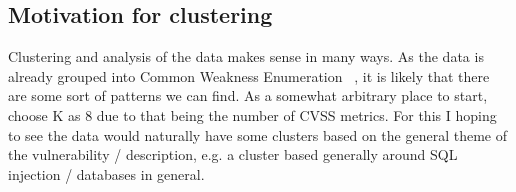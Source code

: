 \documentclass[12pt]{article}
\begin{document}
\begin{table}[H]
	\centering
	\caption{Comparison of the effects of the pre-trained models on the CVSS v3.1 dataset (Part 2).}
	\label{tab:distil_part2}
\end{table}

\subsection{Motivation for clustering}


Clustering and analysis of the data makes sense in many ways. As the data is already grouped into
Common Weakness Enumeration~\cite{CWE} , it is likely that there are some sort of patterns we can
find. As a somewhat arbitrary place to start, choose K as 8 due to that being the number of CVSS
metrics. For this I hoping to see the data would naturally have some clusters based on the general
theme of the vulnerability / description, e.g. a cluster based generally around SQL injection /
databases in general.
\end{document}
